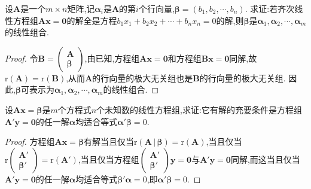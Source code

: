 \documentclass[lang=cn,newtx,10pt,scheme=chinese]{elegantbook}
\begin{document}
\begin{example}
设\(\boldsymbol{A}\)是一个\(m\times n\)矩阵,记\(\boldsymbol{\alpha}_i\)是\(\boldsymbol{A}\)的第\(i\)个行向量,\(\boldsymbol{\beta}=(b_1,b_2,\cdots,b_n)\). 求证:若齐次线性方程组\(\boldsymbol{A}\boldsymbol{x}=\boldsymbol{0}\)的解全是方程\(b_1x_1 + b_2x_2+\cdots + b_nx_n = 0\)的解,则\(\boldsymbol{\beta}\)是\(\boldsymbol{\alpha}_1,\boldsymbol{\alpha}_2,\cdots,\boldsymbol{\alpha}_m\)的线性组合.
\end{example}
\begin{proof}
令\(\boldsymbol{B}=\begin{pmatrix}
\boldsymbol{A}\\
\boldsymbol{\beta}
\end{pmatrix}\),由已知,方程组\(\boldsymbol{A}\boldsymbol{x}=\boldsymbol{0}\)和方程组\(\boldsymbol{B}\boldsymbol{x}=\boldsymbol{0}\)同解,故\(\mathrm{r}(\boldsymbol{A})=\mathrm{r}(\boldsymbol{B})\),从而\(\boldsymbol{A}\)的行向量的极大无关组也是\(\boldsymbol{B}\)的行向量的极大无关组. 因此,\(\boldsymbol{\beta}\)可表示为\(\boldsymbol{\alpha}_1,\boldsymbol{\alpha}_2,\cdots,\boldsymbol{\alpha}_m\)的线性组合. 
\end{proof}

\begin{example}
设\(\boldsymbol{A}\boldsymbol{x}=\boldsymbol{\beta}\)是\(m\)个方程式\(n\)个未知数的线性方程组,求证:它有解的充要条件是方程组\(\boldsymbol{A}'\boldsymbol{y}=\boldsymbol{0}\)的任一解\(\boldsymbol{\alpha}\)均适合等式\(\boldsymbol{\alpha}'\boldsymbol{\beta}=0\).
\end{example}
\begin{proof}
方程组\(\boldsymbol{A}\boldsymbol{x}=\boldsymbol{\beta}\)有解当且仅当\(\mathrm{r}\left( \boldsymbol{A}\,|\,\boldsymbol{\beta } \right) =\mathrm{r}(\boldsymbol{A})\),当且仅当\(\mathrm{r}\begin{pmatrix}
\boldsymbol{A}'\\
\boldsymbol{\beta}'
\end{pmatrix}=\mathrm{r}(\boldsymbol{A}')\),当且仅当方程组\(\begin{pmatrix}
\boldsymbol{A}'\\
\boldsymbol{\beta}'
\end{pmatrix}\boldsymbol{y}=\boldsymbol{0}\)与\(\boldsymbol{A}'\boldsymbol{y}=\boldsymbol{0}\)同解,而这当且仅当\(\boldsymbol{A}'\boldsymbol{y}=\boldsymbol{0}\)的任一解\(\boldsymbol{\alpha}\)均适合等式\(\boldsymbol{\beta}'\boldsymbol{\alpha}=0\),即\(\boldsymbol{\alpha}'\boldsymbol{\beta}=0\).
\end{proof}
\end{document}
